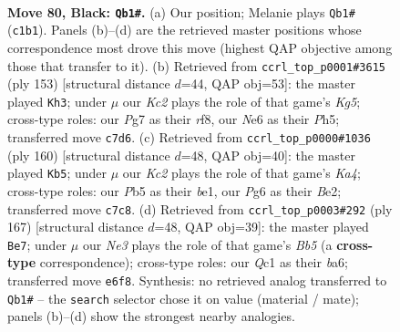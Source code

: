 \documentclass[11pt]{article}
\begin{document}
\clearpage

\begin{figure}[p]\centering
\begin{subfigure}{0.46\textwidth}\centering
\resizebox{\linewidth}{!}{%
\newchessgame
\chessboard[
  setfen={8/2k3p1/2P1n1p1/pp6/1p6/1K6/8/2q5 b - - 2 80},
  showmover=false,
  pgfstyle=straightmove, color=movearrow, markmove={c1-b1}
]}
\caption{}
\end{subfigure}\hfill
\begin{subfigure}{0.46\textwidth}\centering
\resizebox{\linewidth}{!}{%
\newchessgame
\chessboard[
  setfen={5R2/8/8/7p/3p2kP/4p3/4Kp2/8 b - - 3 77},
  showmover=false,
  pgfstyle=straightmove, color=movearrow, markmove={g4-h3}
]}
\caption{}
\end{subfigure}
\\[4pt]
\begin{subfigure}{0.46\textwidth}\centering
\resizebox{\linewidth}{!}{%
\newchessgame
\chessboard[
  setfen={8/8/5kPp/p6P/K7/1P6/4B3/4b3 w - - 9 81},
  showmover=false,
  pgfstyle=straightmove, color=movearrow, markmove={a4-b5}
]}
\caption{}
\end{subfigure}\hfill
\begin{subfigure}{0.46\textwidth}\centering
\resizebox{\linewidth}{!}{%
\newchessgame
\chessboard[
  setfen={8/8/Bp6/p5p1/PbPk1p2/5K2/8/8 b - - 79 84},
  showmover=false,
  pgfstyle=straightmove, color=movearrow, markmove={b4-e7}
]}
\caption{}
\end{subfigure}
\caption{\textbf{Move 80, Black: \texttt{Qb1\#}.} (a) Our position; Melanie plays \texttt{Qb1\#} (\texttt{c1b1}). Panels (b)--(d) are the retrieved master positions whose correspondence most drove this move (highest QAP objective among those that transfer to it). (b) Retrieved from \texttt{ccrl\_top\_p0001\#3615} (ply 153) [structural distance $d$=44, QAP obj=53]: the master played \texttt{Kh3}; under $\mu$ our \emph{Kc2} plays the role of that game's \emph{Kg5}; cross-type roles: our \emph{P}g7 as their \emph{r}f8, our \emph{N}e6 as their \emph{P}h5; transferred move \texttt{c7d6}. (c) Retrieved from \texttt{ccrl\_top\_p0000\#1036} (ply 160) [structural distance $d$=48, QAP obj=40]: the master played \texttt{Kb5}; under $\mu$ our \emph{Kc2} plays the role of that game's \emph{Ka4}; cross-type roles: our \emph{P}b5 as their \emph{b}e1, our \emph{P}g6 as their \emph{B}e2; transferred move \texttt{c7c8}. (d) Retrieved from \texttt{ccrl\_top\_p0003\#292} (ply 167) [structural distance $d$=48, QAP obj=39]: the master played \texttt{Be7}; under $\mu$ our \emph{Ne3} plays the role of that game's \emph{Bb5} (a \textbf{cross-type} correspondence); cross-type roles: our \emph{Q}c1 as their \emph{b}a6; transferred move \texttt{e6f8}. Synthesis: no retrieved analog transferred to \texttt{Qb1\#} -- the \texttt{search} selector chose it on value (material / mate); panels (b)--(d) show the strongest nearby analogies.}
\label{fig:thought-m159}
\end{figure}
\end{document}
